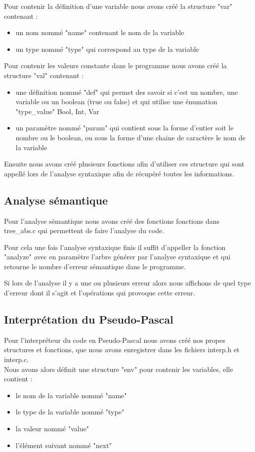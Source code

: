 \documentclass{report}
\begin{document}
Pour contenir la définition d'une variable nous avons créé la structure "var" contenant :
\begin{itemize}
\item un nom nommé "name" contenant le nom de la variable
\item un type nommé "type" qui correspond au type de la variable
\end{itemize}
\bigskip

Pour contenir les valeurs constante dans le programme nous avons créé la structure "val" contenant :
\begin{itemize}
\item une définition nommé "def" qui permet des savoir si c'est un nombre, une variable ou un boolean (true ou false) et qui utilise une énumation "type\_value" {Bool, Int, Var}
\item un paramètre nommé "param" qui contient sous la forme d'entier soit le nombre ou le boolean, ou sous la forme d'une chaine de caractère le nom de la variable
\end{itemize}
\bigskip

Ensuite nous avons créé plusieurs fonctions afin d'utiliser ces structure qui sont appellé lors de l'analyse syntaxique afin de récupéré toutes les informations. 

\subsection{Analyse sémantique}
Pour l'analyse sémantique nous avons créé des fonctions fonctions dans tree\_abs.c qui permettent de faire l'analyse du code.

Pour cela une fois l'analyse syntaxique finis il suffit d'appeller la fonction "analyze" avec en paramètre l'arbre générer par l'analyse syntaxique et qui retourne le nombre d'erreur sémantique dans le programme.

Si lors de l'analyse il y a une ou plusieurs erreur alors nous affichons de quel type d'erreur dont il s'agit et l'opérations qui provoque cette erreur.

\subsection{Interprétation du Pseudo-Pascal}
Pour l'interpréteur du code en Pseudo-Pascal nous avons créé nos propes structures et fonctions, que nous avons enregistrer dans les fichiers interp.h et interp.c.\\

Nous avons alors définit une structure "env" pour contenir les variables, elle contient :
\begin{itemize}
\item le nom de la variable nommé "name"
\item le type de la variable nommé "type"
\item la valeur nommé "value"
\item l'élément suivant nommé "next"
\end{itemize}
\bigskip
\end{document}
